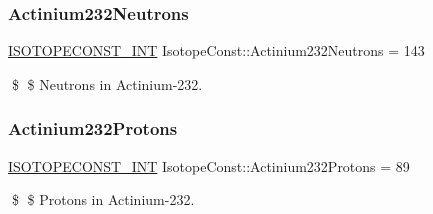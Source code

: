 \subsubsection{\texorpdfstring{Actinium232\+Neutrons}{Actinium232Neutrons}}
{\footnotesize\ttfamily \mbox{\hyperlink{group___isotope_const-_macros_ga5f18360b3e99483a35c32d789e62621c}{I\+S\+O\+T\+O\+P\+E\+C\+O\+N\+S\+T\+\_\+\+I\+NT}} Isotope\+Const\+::\+Actinium232\+Neutrons = 143}

\$ \$ Neutrons in Actinium-\/232. \mbox{\label{group___isotope_const-_actinium-_ac232_ga6231110d161e04ac2d35f79aef44f4ff}} 
\subsubsection{\texorpdfstring{Actinium232\+Protons}{Actinium232Protons}}
{\footnotesize\ttfamily \mbox{\hyperlink{group___isotope_const-_macros_ga5f18360b3e99483a35c32d789e62621c}{I\+S\+O\+T\+O\+P\+E\+C\+O\+N\+S\+T\+\_\+\+I\+NT}} Isotope\+Const\+::\+Actinium232\+Protons = 89}

\$ \$ Protons in Actinium-\/232. 